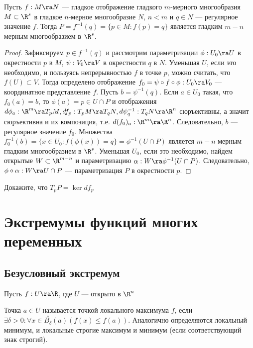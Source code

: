 \begin{theorem}
    Пусть \(f: M \ra N\) --- гладкое отображение гладкого \(m\)-мерного многообразия \(M \subset \R^s\) в гладкое \(n\)-мерное многообразие \(N\), \(n < m\) и \(q \in N\) --- регулярное значение \(f\). Тогда \(P = f^{-1}(q) = \{p \in M: f(p) = q\}\) является гладким \(m - n\) мерным многообразием в \(\R^s\).
\end{theorem}
\begin{proof}
    Зафиксируем \(p \in f^{-1}(q)\) и рассмотрим параметризации \(\phi: U_0 \ra U\) в окрестности \(p\) в \(M\), \(\psi: V_0 \ra V\) в окрестности \(q\) в \(N\). Уменьшая \(U\), если это необходимо, и пользуясь непрерывностью \(f\) в точке \(p\), можно считать, что \(f(U) \subset V\). Тогда определено отображение \(f_0 = \psi \circ f \circ \phi: U_0 \ra V_0\) --- координатное представление \(f\). Пусть \(b = \psi^{-1}(q)\). Если \(a \in U_0\) такая, что \(f_0(a) = b\), то \(\phi(a) = p \in U \cap P\) и отображения \(d\phi_a: \R^m \ra T_pM, df_p: T_pM \ra T_qN, d\psi^{-1}_q: T_qN \ra \R^n\) сюръективны, а значит сюръективна и их композиция, т.е. \(d(f_0)_a: \R^m \ra \R^n\). Следовательно, \(b\) --- регулярное значение \(f_0\). Множества \(f^{-1}_0(b) = \{x \in U_0: f(\phi(x)) = q\} = \phi^{-1}(U \cap P)\) является \(m - n\) мерным гладким многообразием в \(\R^s\). Уменьшая \(U_0\), если это необходимо, найдем открытые \(W \subset \R^{m - n}\) и параметризацию \(\alpha: W \ra \phi^{-1}(U \cap P)\). Следовательно, \(\phi \circ \alpha: W \ra U \cap P\) --- параметризация \(P\) в окрестности \(p\).
\end{proof}

\begin{problem}
    Докажите, что \(T_pP = \ker df_p\)
\end{problem}

\section{Экстремумы функций многих переменных}
\subsection{Безусловный экстремум}
Пусть \(f: U \ra \R\), где \(U\) --- открыто в \(\R^n\)
\begin{definition}
    Точка \(a \in U\) называется точкой локального максимума \(f\), если \(\exists \delta > 0: \forall x \in \stackrel{\circ}{B_{\delta}}(a) (f(x) \le f(a))\). Аналогично определяются локальный минимум, и локальные строгие максимум и минимум (если соответствующий знак строгий).
\end{definition}

